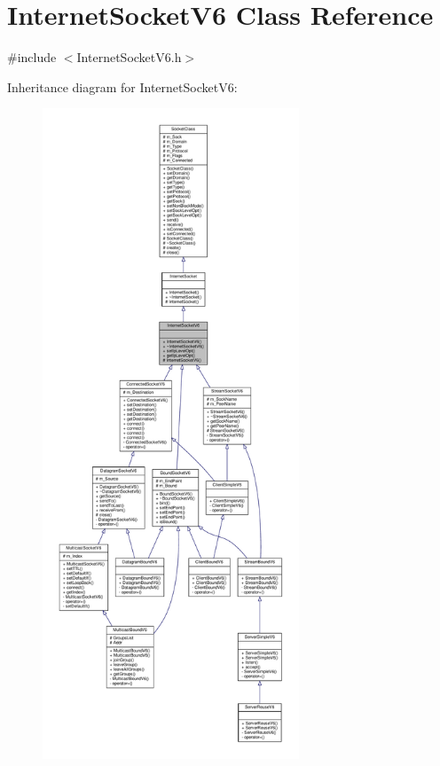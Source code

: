 \hypertarget{classInternetSocketV6}{}\section{Internet\+Socket\+V6 Class Reference}
\label{classInternetSocketV6}


{\ttfamily \#include $<$Internet\+Socket\+V6.\+h$>$}



Inheritance diagram for Internet\+Socket\+V6\+:\nopagebreak
\begin{figure}[H]
\begin{center}
\leavevmode
\includegraphics[height=550pt]{classInternetSocketV6__inherit__graph}
\end{center}
\end{figure}
